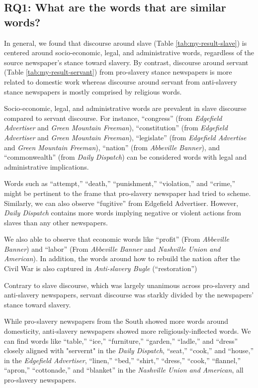 \documentclass[11pt]{article}
\begin{document}
\subsection{RQ1: What are the words that are similar words?} \label{findings:rq1}
In general, we found that discourse around slave (Table \ref{tab:my-result-slave}) is centered around socio-economic, legal, and administrative words, regardless of the source newspaper's stance toward slavery.
By contrast, discourse around servant (Table \ref{tab:my-result-servant}) from pro-slavery stance newspapers is more related to domestic work whereas discourse around servant from anti-slavery stance newspapers is mostly comprised by religious words.

Socio-economic, legal, and administrative words are prevalent in slave discourse compared to servant discourse.
For instance, ``congress'' (from \textit{Edgefield Advertiser} and \textit{Green Mountain Freeman}), ``constitution'' (from \textit{Edgefield Advertiser} and \textit{Green Mountain Freeman}), ``legislate'' (from \textit{Edgefield Advertise} and \textit{Green Mountain Freeman}), ``nation'' (from \textit{Abbeville Banner}), and ``commonwealth'' (from \textit{Daily Dispatch}) can be considered words with legal and administrative implications.

Words such as ``attempt,'' ``death,'' ``punishment,'' ``violation,'' and ``crime,'' might be pertinent to the frame that pro-slavery newspaper had tried to scheme.
Similarly, we can also observe ``fugitive'' from Edgefield Advertiser.
However, \textit{Daily Dispatch} contains more words implying negative or violent actions from slaves than any other newspapers.

We also able to observe that economic words like ``profit'' (From \textit{Abbeville Banner}) and ``labor'' (From \textit{Abbeville Banner} and \textit{Nashville Union and American}).
In addition, the words around how to rebuild the nation after the Civil War is also captured in \textit{Anti-slavery Bugle} (``restoration'')

Contrary to slave discourse, which was largely unanimous across pro-slavery and anti-slavery newspapers, servant discourse was starkly divided by the newspapers' stance toward slavery.

While pro-slavery newspapers from the South showed more words around domesticity, anti-slavery newspapers showed more religiously-inflected words.
We can find words like ``table,'' ``ice,'' ``furniture,'' ``garden,'' ``ladle,'' and ``dress'' closely aligned with "servernt" in the \textit{Daily Dispatch}, ``seat,'' ``cook,'' and ``house,'' in the \textit{Edgefield Advertiser}, ``linen,'' ``bed,'' ``shirt,'' ``dress,'' ``cook,'' ``flannel,'' ``apron,''  ``cottonade,'' and ``blanket'' in the \textit{Nashville Union and American}, all pro-slavery newspapers. 
\end{document}
